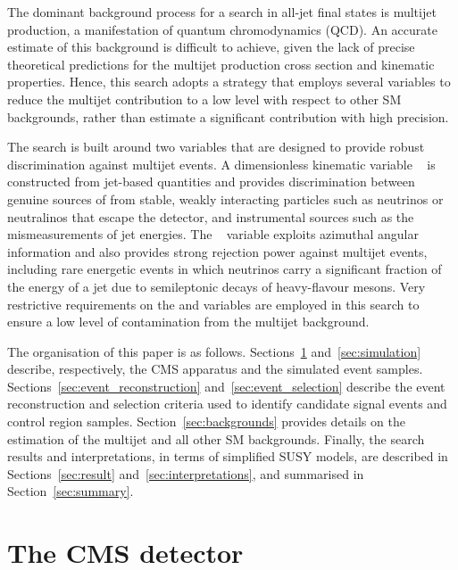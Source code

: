 The dominant background process for a search in all-jet final states
is multijet production, a manifestation of quantum chromodynamics
(QCD). An accurate estimate of this background is difficult to
achieve, given the lack of precise theoretical predictions for the
multijet production cross section and kinematic properties.
Hence, this search adopts a strategy that employs several variables to
reduce the multijet contribution to a low level with respect to other
SM backgrounds, rather than estimate a significant contribution with
high precision.


The search is built around two variables that are designed to provide
robust discrimination against multijet events. A dimensionless
kinematic variable \alphat~\cite{Randall:2008rw, RA1Paper} is
constructed from jet-based quantities and provides discrimination
between genuine sources of \ptvecmiss from stable, weakly interacting
particles such as neutrinos or neutralinos that escape the detector,
and instrumental sources such as the mismeasurements of jet
energies. The \bdphi~\cite{RA1Paper} variable exploits azimuthal
angular information and also provides strong rejection power against
multijet events, including rare energetic events in which neutrinos
carry a significant fraction of the energy of a jet due to
semileptonic decays of heavy-flavour mesons. Very restrictive
requirements on the \alphat and \dphi variables are employed in this
search to ensure a low level of contamination from the multijet
background.

The organisation of this paper is as
follows. Sections~\ref{sec:detector} and~\ref{sec:simulation}
describe, respectively, the CMS apparatus and the simulated event
samples. Sections~\ref{sec:event_reconstruction}
and~\ref{sec:event_selection} describe the event reconstruction and
selection criteria used to identify candidate signal events and
control region samples. Section~\ref{sec:backgrounds} provides details
on the estimation of the multijet and all other SM
backgrounds. Finally, the search results and interpretations, in terms
of simplified SUSY models, are described in
Sections~\ref{sec:result} and~\ref{sec:interpretations}, and
summarised in Section~\ref{sec:summary}.


\section{The CMS detector}
\label{sec:detector}



